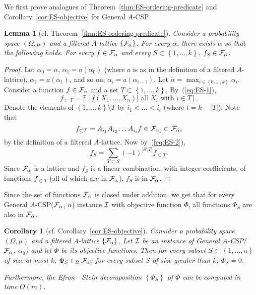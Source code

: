 \documentclass[11pt]{article}
\newcommand {\set}   [1] {\left\{ #1 \right\}}
\newcommand {\Exp}       {\mathbb{E}}
\newcommand {\E}     [1] {\Exp\left[#1\right]}
\newcommand {\calF}   {{\cal{F}}}
\newcommand {\calI}    {{\cal I}}
\newtheorem{lemma}[theorem]{Lemma}
\newtheorem{corollary}[theorem]{Corollary}
\begin{document}
We first prove analogues of Theorem~\ref{thm:ES-ordering-predicate} and Corollary~\ref{cor:ES-objective} for General $A$-CSP.
\begin{lemma}[cf. Theorem~\ref{thm:ES-ordering-predicate}]\label{lem:ES-general-predicate}
Consider a probability space $(\Omega,\mu)$ and a filtered $A$-lattice $\set{\calF_{\alpha}}$.
For every $\alpha$, there exists $\tilde\alpha$ so that the following holds. For every $f \in \calF_{\alpha}$ and every $S\subset \set{1,\dots, k}$,
$f_S \in \calF_{\tilde\alpha}$.
\end{lemma}
\begin{proof}
Let $\alpha_0 = \alpha$, $\alpha_1 = a(\alpha_0)$ (where $a$ is as in the definition of a filtered $A$-lattice), $\alpha_2 = a(\alpha_1)$, and so on;
$\alpha_i = a(\alpha_{i-1})$. Let $\tilde \alpha = \max_{i\in \set{0,\dots, k}} \alpha_i$.
Consider a function $f \in\calF_{\alpha}$ and a set $T\subset\set{1,\dots,k}$. By~(\ref{eq:ES-1}),
$$f_{\subset T} = \E{f(X_1,\dots, X_n)| \text{ all } X_i \text{ with } i \in T}.$$
Denote the elements of $\set{1,\dots,k}\setminus T$ by $i_1< \dots < i_t$ (where $t = k - |T|$). Note that
$$f_{\subset T} = A_{i_1} A_{i_2} \dots A_{i_t} f \in \calF_{\alpha_{t}} \subset \calF_{\tilde\alpha},$$
by the definition of a filtered $A$-lattice.
Now by~(\ref{eq:ES-2}),
$$f_S = \sum_{T\subset S} (-1)^{|S\setminus T|} f_{\subset T}.$$
Since $\calF_{\tilde\alpha}$ is a lattice and $f_S$ is a linear combination, with integer coefficients, of functions $f_{\subset T}$ (all of which are in $\calF_{\tilde\alpha}$),
$f_S$ is in $\calF_{\tilde\alpha}$.
\end{proof}
Since the set of functions $\calF_{\tilde\alpha}$ is closed under addition, we get that for every General $A$-CSP($\calF_{\alpha}$, $\alpha$) instance $\calI$ with objective
function $\Phi$, all functions $\Phi_S$ are also in $\calF_{\tilde\alpha}$.
\begin{corollary}[cf. Corollary~\ref{cor:ES-objective}]
Consider a probability space $(\Omega,\mu)$ and a filtered $A$-lattice $\set{\calF_{\alpha}}$.
Let $\calI$ be an instance of General $A$-CSP($\calF_{\alpha}$, $\alpha_0$) and let $\Phi$ be its objective functions.
Then for every subset $S\subset \set{1,\dots, n}$ of size at most $k$, $\Phi_S\in_R\calF_{\tilde\alpha}$;
for every subset $S$ of size greater than $k$, $\Phi_S = 0$.

Furthermore, the Efron---Stein decomposition $\set{\Phi_S}$ of $\Phi$ can be computed in time $O(m)$.
\end{corollary}
\end{document}
